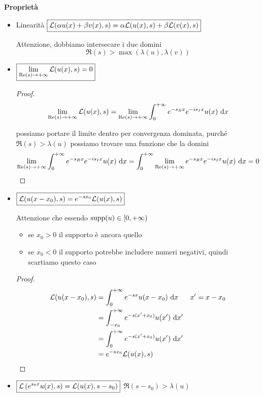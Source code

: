 \textbf{Proprietà}
\begin{itemize}
\item Linearità $\boxed{\mathcal{L}(\alpha u(x) + \beta v(x), s) = \alpha \mathcal{L}(u(x), s) + \beta \mathcal{L}(v(x), s)}$

Attenzione, dobbiamo intersecare i due domini
\begin{equation*}
\boxed{\Re (s) > \max(\lambda (u), \lambda (v))}
\end{equation*}
\item $\boxed{\lim\limits_{\operatorname{Re} (s)\rightarrow + \infty}\mathcal{L}(u(x), s) = 0}$

\begin{proof}
\begin{equation*}
\lim\limits_{\operatorname{Re} (s)\rightarrow + \infty}\mathcal{L}(u(x), s) = \lim\limits_{\operatorname{Re} (s)\rightarrow + \infty}\int^{+ \infty}_{0} e^{- s_{R} x} e^{- is_{I} x} u(x) \  \mathrm{d} x
\end{equation*}

possiamo portare il limite dentro per convergenza dominata, purché $\Re (s) > \lambda (u)$ possiamo trovare una funzione che la domini
\begin{equation*}
\lim\limits_{\operatorname{Re} (s)\rightarrow + \infty}\int^{+ \infty}_{0} e^{- s_{R} x} e^{- is_{I} x} u(x) \  \mathrm{d} x = \int^{+ \infty}_{0}\lim\limits_{\operatorname{Re} (s)\rightarrow + \infty} e^{- s_{R} x} e^{- is_{I} x} u(x) \  \mathrm{d} x = 0
\end{equation*}
\end{proof}
\item $\boxed{\mathcal{L}(u(x - x_{0}), s) = e^{- sx_{0}}\mathcal{L}(u(x), s)}$

Attenzione che essendo $\operatorname*{supp}(u) \in [0, + \infty)$
\begin{itemize}
\item se $\boxed{x_{0} > 0}$ il supporto è ancora quello
\item se $x_{0} < 0$ il supporto potrebbe includere numeri negativi, quindi scartiamo questo caso
\end{itemize}

\begin{proof}
\begin{align*}
\mathcal{L}(u(x - x_{0}), s) & = \int^{+ \infty}_{0} e^{- sx} u(x - x_{0}) \  \mathrm{d} x & x' = x - x_{0}\\
 & = \int^{+ \infty}_{- x_{0}} e^{- s(x' + x_{0})} u(x') \  \mathrm{d} x' & \\
 & = \int^{+ \infty}_{0} e^{- s(x' + x_{0})} u(x') \  \mathrm{d} x' & \\
 & = e^{- sx_{0}}\mathcal{L}(u(x), s) &
\end{align*}
\end{proof}
\item $\boxed{\mathcal{L}\left(e^{s_{0} x} u(x), s\right) = \mathcal{L}(u(x), s - s_{0})}$ $\boxed{\Re (s - s_{0}) > \lambda (u)}$


\end{itemize}

